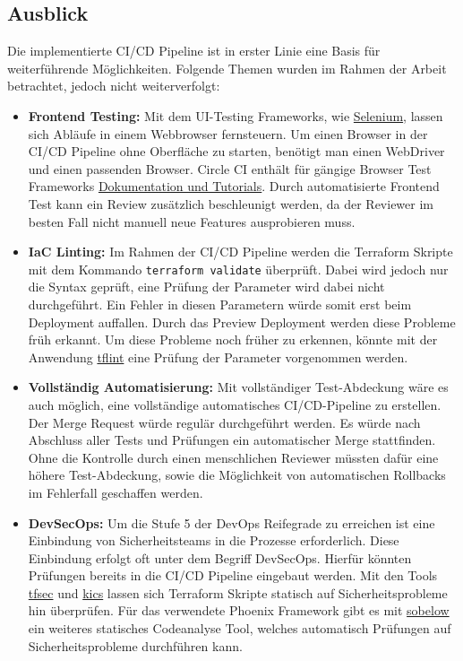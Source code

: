 \subsection{Ausblick}\label{ausblick}

Die implementierte CI/CD Pipeline ist in erster Linie eine Basis für weiterführende Möglichkeiten.
Folgende Themen wurden im Rahmen der Arbeit betrachtet, jedoch nicht weiterverfolgt:

\begin{itemize}
    \item \textbf{Frontend Testing:}
    Mit dem UI-Testing Frameworks, wie \href{https://www.selenium.dev/}{Selenium}, lassen sich Abläufe in einem Webbrowser fernsteuern.
    Um einen Browser in der CI/CD Pipeline ohne Oberfläche zu starten, benötigt man einen WebDriver und einen passenden Browser.
    Circle CI enthält für gängige Browser Test Frameworks \href{https://circleci.com/docs/2.0/browser-testing/}{Dokumentation und Tutorials}.
    Durch automatisierte Frontend Test kann ein Review zusätzlich beschleunigt werden,
    da der Reviewer im besten Fall nicht manuell neue Features ausprobieren muss.

    \item \textbf{IaC Linting:}
    Im Rahmen der CI/CD Pipeline werden die Terraform Skripte mit dem Kommando \texttt{terraform validate} überprüft.
    Dabei wird jedoch nur die Syntax geprüft, eine Prüfung der Parameter wird dabei nicht durchgeführt.
    Ein Fehler in diesen Parametern würde somit erst beim Deployment auffallen.
    Durch das Preview Deployment werden diese Probleme früh erkannt.
    Um diese Probleme noch früher zu erkennen, könnte mit der Anwendung \href{https://github.com/terraform-linters/tflint}{tflint} eine Prüfung der Parameter vorgenommen werden.

    \item \textbf{Vollständig Automatisierung:}
    Mit vollständiger Test-Abdeckung wäre es auch möglich, eine vollständige automatisches CI/CD-Pipeline zu erstellen.
    Der Merge Request würde regulär durchgeführt werden.
    Es würde nach Abschluss aller Tests und Prüfungen ein automatischer Merge stattfinden.
    Ohne die Kontrolle durch einen menschlichen Reviewer müssten dafür eine höhere Test-Abdeckung, sowie die Möglichkeit von automatischen Rollbacks im Fehlerfall geschaffen werden.

    \item \textbf{DevSecOps:}
    Um die Stufe 5 der DevOps Reifegrade zu erreichen ist eine Einbindung von Sicherheitsteams in die Prozesse erforderlich.
    Diese Einbindung erfolgt oft unter dem Begriff DevSecOps.
    Hierfür könnten Prüfungen bereits in die CI/CD Pipeline eingebaut werden.
    Mit den Tools \href{https://github.com/tfsec/tfsec}{tfsec} und \href{https://kics.io/}{kics} lassen sich Terraform Skripte statisch auf Sicherheitsprobleme hin überprüfen.
    Für das verwendete Phoenix Framework gibt es mit \href{https://github.com/nccgroup/sobelow}{sobelow} ein weiteres statisches Codeanalyse Tool,
    welches automatisch Prüfungen auf Sicherheitsprobleme durchführen kann.
\end{itemize}


